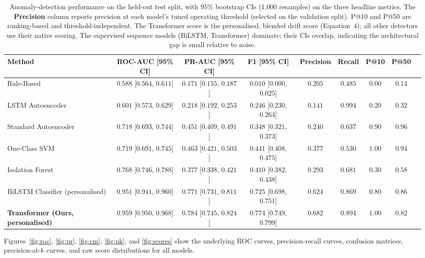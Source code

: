 \documentclass[sigconf]{acmart}
\begin{document}
\begin{table}[htbp]
\caption{Anomaly-detection performance on the held-out test split, with $95\%$ bootstrap CIs (1{,}000 resamples) on the three headline metrics. The \textbf{Precision} column reports precision at each model's tuned operating threshold (selected on the validation split). P@10 and P@50 are ranking-based and threshold-independent. The Transformer score is the personalised, blended drift score (Equation~$4$); all other detectors use their native scoring. The supervised sequence models (BiLSTM, Transformer) dominate; their CIs overlap, indicating the architectural gap is small relative to noise.}
\label{tab:main_results}
\centering
\small
\begin{tabular}{lcccccccc}
\toprule
\textbf{Method} & \textbf{ROC-AUC [95\% CI]} & \textbf{PR-AUC [95\% CI]} & \textbf{F1 [95\% CI]} & \textbf{Precision} & \textbf{Recall} & \textbf{P@10} & \textbf{P@50} \\
\midrule
Rule-Based            & $0.588$ [$0.564$, $0.611$] & $0.171$ [$0.155$, $0.187$] & $0.010$ [$0.000$, $0.025$] & $0.205$ & $0.485$ & $0.00$ & $0.14$ \\
LSTM Autoencoder      & $0.601$ [$0.573$, $0.629$] & $0.218$ [$0.192$, $0.253$] & $0.246$ [$0.230$, $0.264$] & $0.141$ & $0.994$ & $0.20$ & $0.32$ \\
Standard Autoencoder  & $0.718$ [$0.693$, $0.744$] & $0.451$ [$0.409$, $0.491$] & $0.348$ [$0.321$, $0.373$] & $0.240$ & $0.637$ & $0.90$ & $0.96$ \\
One-Class SVM         & $0.719$ [$0.691$, $0.745$] & $0.463$ [$0.421$, $0.503$] & $0.441$ [$0.408$, $0.475$] & $0.377$ & $0.530$ & $1.00$ & $0.94$ \\
Isolation Forest      & $0.768$ [$0.746$, $0.788$] & $0.377$ [$0.338$, $0.421$] & $0.410$ [$0.382$, $0.438$] & $0.293$ & $0.681$ & $0.30$ & $0.58$ \\
BiLSTM Classifier (personalised)     & $0.951$ [$0.941$, $0.960$] & $0.771$ [$0.731$, $0.811$] & $0.725$ [$0.698$, $0.751$] & $0.624$ & $0.869$ & $0.80$ & $0.86$ \\
\textbf{Transformer (Ours, personalised)} & $\mathbf{0.959}$ [$0.950$, $0.968$] & $\mathbf{0.784}$ [$0.745$, $0.824$] & $\mathbf{0.774}$ [$0.749$, $0.799$] & $\mathbf{0.682}$ & $\mathbf{0.894}$ & $\mathbf{1.00}$ & $0.82$ \\
\bottomrule
\end{tabular}
\end{table}

Figures~\ref{fig:roc}, \ref{fig:pr}, \ref{fig:cm}, \ref{fig:pk}, and \ref{fig:scores} show the underlying ROC curves, precision-recall curves, confusion matrices, precision-at-$k$ curves, and raw score distributions for all models.
\end{document}
